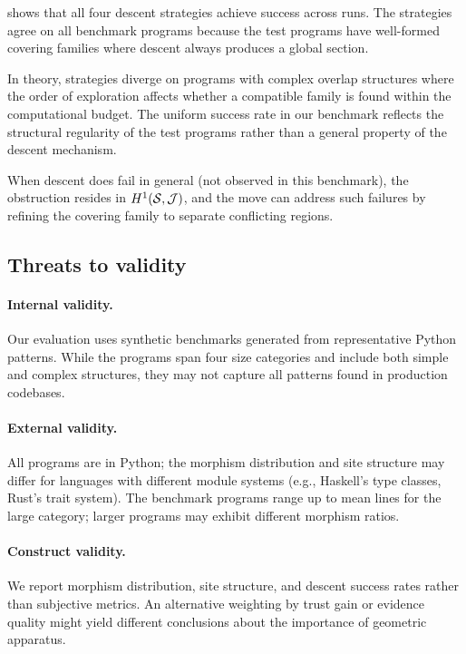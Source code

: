 \documentclass[11pt]{article}
\begin{document}
 shows that all four descent strategies
achieve \compDescentEagerRate{} success across \compDescentEagerRuns{}
runs.  The strategies agree on all benchmark programs because the
test programs have well-formed covering families where descent
always produces a global section.

In theory, strategies diverge on programs with complex overlap
structures where the order of exploration affects whether a
compatible family is found within the computational budget.
The uniform success rate in our benchmark reflects the structural
regularity of the test programs rather than a general property
of the descent mechanism.

When descent does fail in general (not observed in this benchmark),
the obstruction resides in $H^{1}(\mathcal{S}, \mathcal{J})$, and the
\REPAIR{} move can address such failures by refining the covering
family to separate conflicting regions.

\subsection{Threats to validity}\label{sec:eval-threats}

\paragraph{Internal validity.}
Our evaluation uses synthetic benchmarks generated from
representative Python patterns.  While the \compTotalPrograms{} programs span
four size categories and include both simple and complex structures,
they may not capture all patterns found in production codebases.

\paragraph{External validity.}
All programs are in Python; the morphism distribution and
site structure may differ for languages with
different module systems (e.g., Haskell's type classes, Rust's
trait system).  The benchmark programs range up to
\compLargeMeanLines{} mean lines for the large category;
larger programs may exhibit different morphism ratios.

\paragraph{Construct validity.}
We report morphism distribution, site structure, and descent
success rates rather than subjective metrics.
An alternative weighting by trust gain or evidence quality might
yield different conclusions about the importance of geometric
apparatus.
\end{document}
